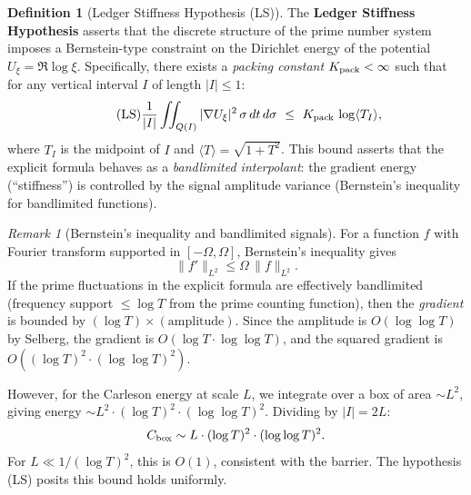 \documentclass[11pt]{article}
\theoremstyle{definition}
\newtheorem{definition}[theorem]{Definition}
\theoremstyle{remark}
\newtheorem{remark}[theorem]{Remark}
\theoremstyle{definition}
\begin{document}
\begin{definition}[Ledger Stiffness Hypothesis \textup{(LS)}]\label{def:ledger-stiffness}
The \textbf{Ledger Stiffness Hypothesis} asserts that the discrete structure of the prime number system imposes a Bernstein-type constraint on the Dirichlet energy of the potential $U_\xi = \Re\log\xi$. Specifically, there exists a \emph{packing constant} $K_{\rm pack} < \infty$ such that for any vertical interval $I$ of length $|I| \le 1$:
\begin{equation}\label{eq:ledger-stiffness}
  \tag{LS}
  \frac{1}{|I|} \iint_{Q(I)} |\nabla U_\xi|^2\,\sigma\,dt\,d\sigma \ \le\ K_{\rm pack}\,\log\langle T_I\rangle,
\end{equation}
where $T_I$ is the midpoint of $I$ and $\langle T \rangle = \sqrt{1+T^2}$. This bound asserts that the explicit formula behaves as a \emph{bandlimited interpolant}: the gradient energy (``stiffness'') is controlled by the signal amplitude variance (Bernstein's inequality for bandlimited functions).
\end{definition}

\begin{remark}[Bernstein's inequality and bandlimited signals]\label{rem:bernstein}
For a function $f$ with Fourier transform supported in $[-\Omega, \Omega]$, Bernstein's inequality gives
\[
  \|f'\|_{L^2} \le \Omega\,\|f\|_{L^2}.
\]
If the prime fluctuations in the explicit formula are effectively bandlimited (frequency support $\le \log T$ from the prime counting function), then the \emph{gradient} is bounded by $(\log T) \times (\text{amplitude})$. Since the amplitude is $O(\log\log T)$ by Selberg, the gradient is $O(\log T \cdot \log\log T)$, and the squared gradient is $O((\log T)^2 \cdot (\log\log T)^2)$.

However, for the Carleson energy at scale $L$, we integrate over a box of area $\sim L^2$, giving energy $\sim L^2 \cdot (\log T)^2 \cdot (\log\log T)^2$. Dividing by $|I| = 2L$:
\[
  C_{\rm box} \sim L \cdot (\log T)^2 \cdot (\log\log T)^2.
\]
For $L \ll 1/(\log T)^2$, this is $O(1)$, consistent with the barrier. The hypothesis \textup{(LS)} posits this bound holds uniformly.
\end{remark}
\end{document}
